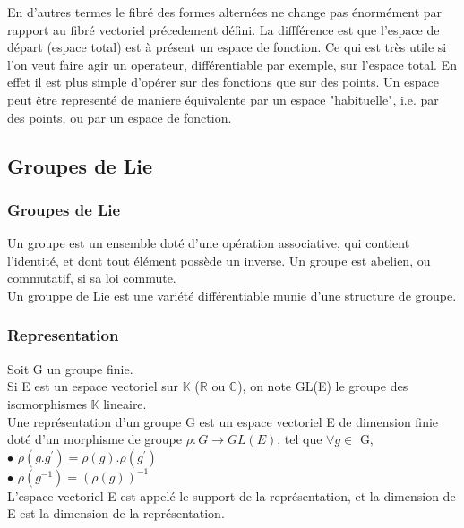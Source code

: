 \documentclass[a4paper,11pt]{article} %
\numberwithin{equation}{section} %
\numberwithin{figure}{section} %
\theoremstyle{plain} %
\theoremstyle{definition} %
\theoremstyle{remark} %
\begin{document}
\noindent
En d'autres termes le fibr\'e des formes altern\'ees ne change pas \'enorm\'ement par rapport au fibr\'e vectoriel pr\'ecedement d\'efini. La difff\'erence est que l'espace de d\'epart (espace total) est \`a pr\'esent un espace de fonction. Ce qui est tr\`es utile si l'on veut faire agir un operateur, diff\'erentiable par exemple, sur l'espace total. En effet il est plus simple d'op\'erer sur des fonctions que sur des points. Un espace peut \^etre represent\'e de maniere \'equivalente par un espace "habituelle", i.e. par des points, ou par un espace de fonction.\\

\subsection{Groupes de Lie}

\subsubsection{Groupes de Lie}

\noindent
Un groupe est un ensemble dot\'e d'une op\'eration associative, qui contient l'identit\'e, et dont tout \'el\'ement poss\`ede un inverse. Un groupe est abelien, ou commutatif, si sa loi commute.\\

\noindent
Un grouppe de Lie est une vari\'et\'e diff\'erentiable munie d'une structure de groupe.


\subsubsection{Representation}

\noindent
Soit G un groupe finie.\\
Si E est un espace vectoriel sur $\mathbb{K}$ ($\mathbb{R}$ ou  $\mathbb{C}$), on note GL(E) le groupe des isomorphismes  $\mathbb{K}$ lineaire.\\
Une repr\'esentation d'un groupe G est un espace vectoriel E de dimension finie dot\'e d'un morphisme de groupe $ \rho : G \rightarrow GL(E)$, tel que $\forall g \in $ G,\\
$\bullet$ \hspace{0.3cm}$\rho(g.g^{'})=\rho(g).\rho(g^{'})$\\
$\bullet$ \hspace{0.3cm}$\rho(g^{-1})=(\rho(g))^{-1}$\\
L'espace vectoriel E est appel\'e le support de la repr\'esentation, et la dimension de E est la dimension de la repr\'esentation.\\
\end{document}
